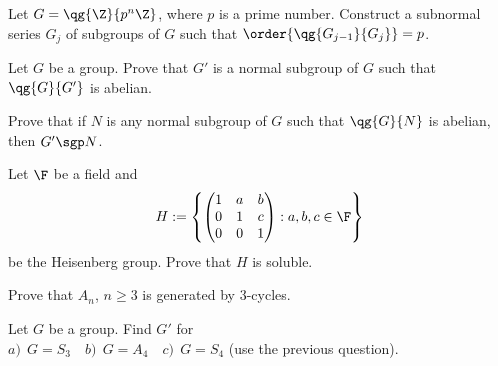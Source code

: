 \documentclass{article}
\begin{document}
\setcounter{section}{11} %
\begin{exercise} \label{qs:11-1} %
Let \( G = \qg{\Z}{p^n\Z} \), where \( p \) is a prime number.
Construct a subnormal series \( G_j \) of subgroups of \( G \) such that \( \order{\qg{G_{j-1}}{G_j}}=p \).
\end{exercise}
\begin{solution}

\end{solution}

\begin{subexercise}
  Let \( G \) be a group.
  Prove that \( G' \) is a normal subgroup of \( G \) such that \( \qg{G}{G'} \) is abelian.
\end{subexercise}
\begin{solution}

\end{solution}

\begin{subexercise}
  Prove that if \( N \) is any normal subgroup of \( G \) such that \( \qg{G}{N} \) is abelian, then \( G'\sgp N \).
\end{subexercise}
\begin{solution}

\end{solution}

\begin{exercise}
  Let \( \F \) be a field and \begin{align*}
    H := \left\{ \begin{pmatrix}
      1 & a & b \\
      0 & 1 & c \\
      0 & 0 & 1
    \end{pmatrix} : a,b,c\in \F \right\}
  \end{align*}
  be the Heisenberg group.
  Prove that \( H \) is soluble.
\end{exercise}
\begin{solution}

\end{solution}

\begin{exercise}
  Prove that \( A_n \), \( n\geq 3 \) is generated by 3-cycles.
\end{exercise}
\begin{solution}

\end{solution}

\begin{exercise}
  Let \( G \) be a group.
  Find \( G' \) for \\
  \( a)\ \ G = S_3 \quad b)\ \ G = A_4 \quad c)\ \ G = S_4 \) (use the previous question).
\end{exercise}
\begin{solution}

\end{solution}
\end{document}
